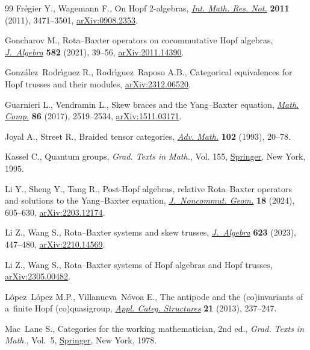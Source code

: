 \documentclass[10pt,a4paper]{amsart}
\numberwithin{equation}{section}
\begin{document}
\begin{thebibliography}{99}
Fr\'egier Y., Wagemann F., On {H}opf 2-algebras, \href{https://doi.org/10.1093/imrn/rnq224}{\textit{Int. Math. Res. Not.}}
 \textbf{2011} (2011), 3471--3501, \href{https://arxiv.org/abs/0908.2353}{arXiv:0908.2353}.

Goncharov M., Rota--{B}axter operators on cocommutative {H}opf algebras,
 \href{https://doi.org/10.1016/j.jalgebra.2021.04.024}{\textit{J.~Algebra}} \textbf{582} (2021), 39--56, \href{https://arxiv.org/abs/2011.14390}{arXiv:2011.14390}.

Gonz\'alez~Rodr\'{\i}guez R., Rodr\'{\i}guez~Raposo A.B., Categorical
 equivalences for Hopf trusses and their modules, \href{https://arxiv.org/abs/2312.06520}{arXiv:2312.06520}.

Guarnieri L., Vendramin L., Skew braces and the {Y}ang--{B}axter equation,
 \href{https://doi.org/10.1090/mcom/3161}{\textit{Math. Comp.}} \textbf{86} (2017), 2519--2534, \href{https://arxiv.org/abs/1511.03171}{arXiv:1511.03171}.

Joyal A., Street R., Braided tensor categories, \href{https://doi.org/10.1006/aima.1993.1055}{\textit{Adv. Math.}}
 \textbf{102} (1993), 20--78.

Kassel C., Quantum groups, \textit{Grad. Texts in Math.}, Vol. 155, \href{https://doi.org/10.1007/978-1-4612-0783-2}{Springer},
 New York, 1995.

Li Y., Sheng Y., Tang R., Post-{H}opf algebras, relative {R}ota--{B}axter
 operators and solutions to the {Y}ang--{B}axter equation,
 \href{https://doi.org/10.4171/jncg/537}{\textit{J.~Noncommut. Geom.}} \textbf{18} (2024), 605--630,
 \href{https://arxiv.org/abs/2203.12174}{arXiv:2203.12174}.

Li Z., Wang S., Rota--{B}axter systems and skew trusses, \href{https://doi.org/10.1016/j.jalgebra.2023.02.022}{\textit{J.~Algebra}}
 \textbf{623} (2023), 447--480, \href{https://arxiv.org/abs/2210.14569}{arXiv:2210.14569}.

Li Z., Wang S., {R}ota--{B}axter systems of {H}opf algebras and {H}opf trusses,
 \href{https://arxiv.org/abs/2305.00482}{arXiv:2305.00482}.

L\'opez~L\'opez M.P., Villanueva~N\'ovoa E., The antipode and the
 (co)invariants of a~finite {H}opf (co)quasigroup, \href{https://doi.org/10.1007/s10485-011-9260-5}{\textit{Appl. Categ.
 Structures}} \textbf{21} (2013), 237--247.

Mac~Lane S., Categories for the working mathematician, 2nd ed., \textit{Grad. Texts in
 Math.}, Vol.~5, \href{https://doi.org/10.1007/978-1-4757-4721-8}{Springer}, New York, 1978.


\end{thebibliography}
\end{document}
